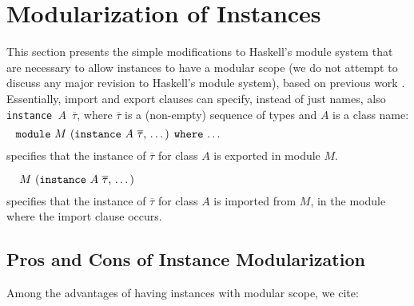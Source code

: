 \section{Modularization of Instances}
\label{sec:modular-instances}

This section presents the simple modifications to Haskell's module
system that are necessary to allow instances to have a modular scope
(we do not attempt to discuss any major revision to Haskell's module
system), based on previous work \cite{Controlling-scope-instances}.
Essentially, import and export clauses can specify, instead of just
names, also {\tt instance $A$ $\overline{\tau}$}, where
$\overline{\tau}$ is a (non-empty) sequence of types and $A$ is a
class name:
  \[ \parbox{\textwidth}{\rm{ \module\ $M$ (\instance\ $A$ $\overline{\tau}$, \ldots) \where\ \ldots}} \]
specifies that the instance of $\overline{\tau}$ for class $A$ is
exported in module $M$.

  \[ \parbox{\textwidth}{\rm{ \ $M$ (\instance\ $A$ $\overline{\tau}$, \ldots)}} \]
specifies that the instance of $\overline{\tau}$ for class $A$ is
imported from $M$, in the module where the import clause occurs.

\subsection{Pros and Cons of Instance Modularization}

Among the advantages of having instances with modular scope, we cite:

